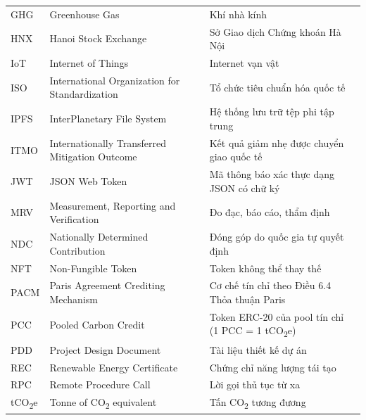 \documentclass[a4paper,oneside]{report}
\begin{document}
\begin{longtable}{@{}p{2.4cm}p{5.4cm}p{6.3cm}@{}}
GHG    & Greenhouse Gas                            & Khí nhà kính \\
HNX    & Hanoi Stock Exchange                      & Sở Giao dịch Chứng khoán Hà Nội \\
IoT    & Internet of Things                        & Internet vạn vật \\
ISO    & International Organization for Standardization & Tổ chức tiêu chuẩn hóa quốc tế \\
IPFS   & InterPlanetary File System                & Hệ thống lưu trữ tệp phi tập trung \\
ITMO   & Internationally Transferred Mitigation Outcome & Kết quả giảm nhẹ được chuyển giao quốc tế \\
JWT    & JSON Web Token                            & Mã thông báo xác thực dạng JSON có chữ ký \\
MRV    & Measurement, Reporting and Verification   & Đo đạc, báo cáo, thẩm định \\
NDC    & Nationally Determined Contribution        & Đóng góp do quốc gia tự quyết định \\
NFT    & Non-Fungible Token                        & Token không thể thay thế \\
PACM   & Paris Agreement Crediting Mechanism       & Cơ chế tín chỉ theo Điều 6.4 Thỏa thuận Paris \\
PCC    & Pooled Carbon Credit                      & Token ERC-20 của pool tín chỉ (1 PCC = 1 tCO\textsubscript{2}e) \\
PDD    & Project Design Document                   & Tài liệu thiết kế dự án \\
REC    & Renewable Energy Certificate              & Chứng chỉ năng lượng tái tạo \\
RPC    & Remote Procedure Call                     & Lời gọi thủ tục từ xa \\
tCO\textsubscript{2}e & Tonne of CO\textsubscript{2} equivalent & Tấn CO\textsubscript{2} tương đương \\

\end{longtable}
\end{document}
